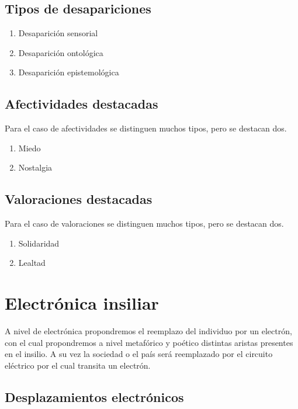 \documentclass[./informes.tex]{subfiles}
\begin{document}
\subsection{Tipos de desapariciones}

\begin{enumerate}
  \item Desaparición sensorial
  \item Desaparición ontológica
  \item Desaparición epistemológica
\end{enumerate}

\subsection{Afectividades destacadas}

Para el caso de afectividades se distinguen muchos tipos, pero se destacan dos.

\begin{enumerate}
  \item Miedo
  \item Nostalgia
\end{enumerate}

\subsection{Valoraciones destacadas}

Para el caso de valoraciones se distinguen muchos tipos, pero se destacan dos.

\begin{enumerate}
  \item Solidaridad
  \item Lealtad
\end{enumerate}

\section{Electrónica insiliar}

A nivel de electrónica propondremos el reemplazo del individuo por un electrón, con el cual propondremos a nivel metafórico y poético distintas aristas presentes en el insilio. A su vez la sociedad o el país será reemplazado por el circuito eléctrico por el cual transita un electrón.

\subsection{Desplazamientos electrónicos}
\end{document}
